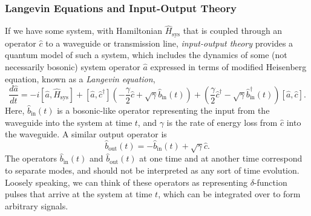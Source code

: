 \subsubsection{\label{ssubs:input_output_theory}Langevin Equations and Input-Output Theory}
If we have some system, with Hamiltonian $\hat{H}_\text{sys}$ that is coupled through an operator $\hat{c}$ to a waveguide or transmission line, \textit{input-output theory}\cite{gardiner_collett_1985} provides a quantum model of such a system, which includes the dynamics of some (not necessarily bosonic) system operator $\hat{a}$ expressed in terms of modified Heisenberg equation, known as a \textit{Langevin equation},
\begin{equation}
    \frac{d\hat{a}}{dt} = -i[\hat{a}, \hat{H}_\text{sys}] + [\hat{a}, \hat{c}^\dagger]\left(-\frac{\gamma}{2}\hat{c} + \sqrt{\gamma}\hat{b}_\text{in}(t)\right) + \left(\frac{\gamma}{2}\hat{c}^\dagger - \sqrt{\gamma}\hat{b}_\text{in}^\dagger(t)\right)[\hat{a}, \hat{c}]. \label{eq:general_langevin_equation}
\end{equation}
Here, $\hat{b}_\text{in}(t)$ is a bosonic-like operator representing the input from the waveguide into the system at time $t$, and $\gamma$ is the rate of energy loss from $\hat{c}$ into the waveguide. A similar output operator is
\begin{equation}
    \hat{b}_\text{out}(t) = -\hat{b}_\text{in}(t) + \sqrt{\gamma}\hat{c}.
    \label{eq:input_output_theory_output}
\end{equation}
The operators $\hat{b}_\text{in}(t)$ and $\hat{b}_\text{out}(t)$ at one time and at another time correspond to separate modes, and should not be interpreted as any sort of time evolution. Loosely speaking, we can think of these operators as representing $\delta$-function pulses that arrive at the system at time $t$, which can be integrated over to form arbitrary signals.

